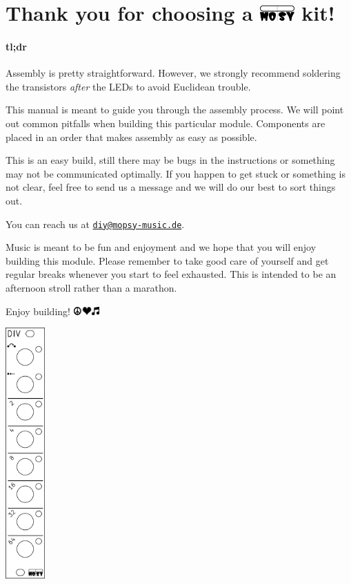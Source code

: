 \documentclass[a4paper,
               11pt,
               parskip=half,
               headinclude,
               titlepage=false]{scrartcl}
\begin{document}
\begin{minipage}{12.5cm}
\setlength{\parskip}{\medskipamount}
\section*{Thank you for choosing a \includegraphics[height=0.8em]{moPsy_logo} kit!}

\paragraph{tl;dr} Assembly is pretty straightforward. However, we strongly recommend soldering the transistors \emph{after} the LEDs to avoid Euclidean trouble.

This manual is meant to guide you through the assembly process.
We will point out common pitfalls when building this particular module.
Components are placed in an order that makes assembly as easy as possible.

This is an {\color{level_easy}easy} build, still there may be bugs in the instructions or something may not be communicated optimally.
If you happen to get stuck or something is not clear, feel free to send us a message and we will do our best to sort things out.

You can reach us at \href{mailto:diy@mopsy-music.de}{\texttt{diy@mopsy-music.de}}.

Music is meant to be fun and enjoyment and we hope that you will enjoy building this module.
Please remember to take good care of yourself and get regular breaks whenever you start to feel exhausted. This is intended to be an afternoon stroll rather than a marathon.

\vspace{1em}
Enjoy building! \quad \includegraphics[height=0.8em]{peace_love_music}

\end{minipage}
\hspace{0.5cm}
\begin{minipage}{1.5cm}
\includegraphics[width=1.5cm]{div-frontpanel}
\end{minipage}
\end{document}
